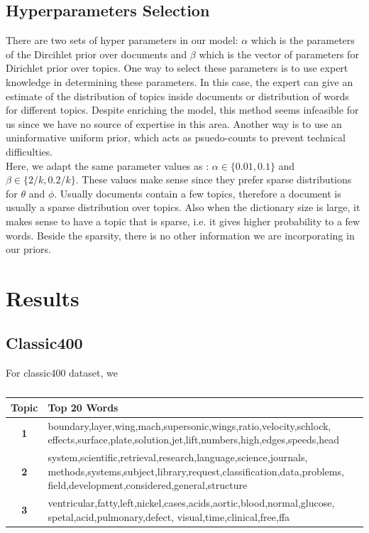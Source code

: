 \documentclass[twoside,12pt]{article}
\begin{document}
\subsection{Hyperparameters Selection}
There are two sets of hyper parameters in our model: $\alpha$ which is the parameters of the Dircihlet prior over documents and $\beta$ which is the vector of parameters for Dirichlet prior over topics. One way to select these parameters is to use expert knowledge in determining these parameters. In this case, the expert can give an estimate of the distribution of topics inside documents or distribution of words for different topics. Despite enriching the model, this method seems infeasible for us since we have no source of expertise in this area. Another way is to use an uninformative uniform prior, which acts as psuedo-counts to prevent technical difficulties.\\
Here, we adapt the same parameter values as \cite{fastlda}: $\alpha \in \{0.01,0.1\}$ and $\beta\in\{2/k,0.2/k\}$. These values make sense since they prefer sparse distributions for $\theta$ and $\phi$. Usually documents contain a few topics, therefore a document is usually a sparse distribution over topics. Also when the dictionary size is large, it makes sense to have a topic that is sparse, i.e. it gives higher probability to a few words. Beside the sparsity, there is no other information we are incorporating in our priors. 

\section{Results}


\subsection{Classic400}
For classic400 dataset, we 


\begin{table}[!]
\begin{center}
\begin{tabular}{| c | p{12cm} |}
\hline
\textbf{Topic}& \textbf{Top 20 Words}  \\ \hline
\textbf{1}&boundary,layer,wing,mach,supersonic,wings,ratio,velocity,schlock, effects,surface,plate,solution,jet,lift,numbers,high,edges,speeds,head\\ \hline
\textbf{2}&system,scientific,retrieval,research,language,science,journals, methods,systems,subject,library,request,classification,data,problems, field,development,considered,general,structure\\
 \hline
\textbf{3}&ventricular,fatty,left,nickel,cases,acids,aortic,blood,normal,glucose, spetal,acid,pulmonary,defect, visual,time,clinical,free,ffa\\
 \hline
 
\end{tabular}
\caption{}
\label{table:2}
\end{center}
\end{table}
\end{document}
